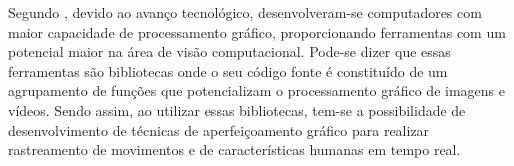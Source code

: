Segundo , devido ao avanço tecnológico, desenvolveram-se computadores com maior capacidade de processamento gráfico, proporcionando ferramentas com um potencial maior na área de visão computacional. Pode-se dizer que essas ferramentas são bibliotecas onde o seu código fonte é constituído de um agrupamento de funções que potencializam o processamento gráfico de imagens e vídeos. Sendo assim, ao utilizar essas bibliotecas, tem-se a possibilidade de desenvolvimento de técnicas de aperfeiçoamento gráfico para realizar rastreamento de movimentos e de características humanas em tempo real.














